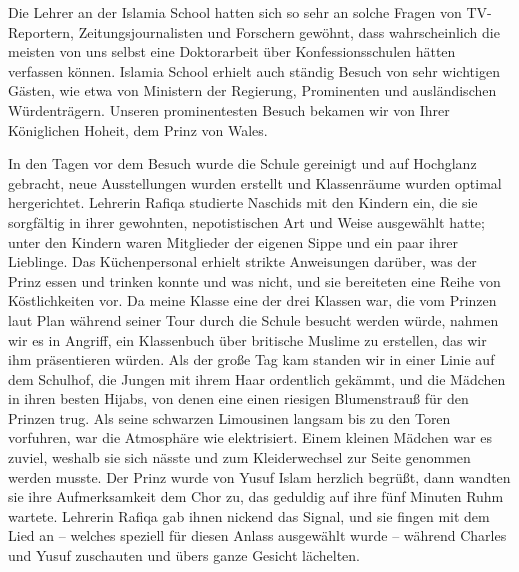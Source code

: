 \documentclass[12pt]{memoir}
\def\–{\hskip0pt-\hskip0pt}
\begin{document}
Die Lehrer an der Islamia School hatten sich so sehr an solche Fragen
von TV\–Reportern, Zeitungsjournalisten und Forschern gewöhnt,
dass wahrscheinlich die meisten von uns selbst
eine Doktorarbeit über Konfessionsschulen hätten verfassen können.
Islamia School erhielt auch ständig Besuch von sehr wichtigen Gästen,
wie etwa von Ministern der Regierung,
Prominenten und ausländischen Würdenträgern.
Unseren prominentesten Besuch bekamen wir von Ihrer Königlichen Hoheit,
dem Prinz von Wales.

In den Tagen vor dem Besuch wurde die Schule gereinigt
und auf Hochglanz gebracht,
neue Ausstellungen wurden erstellt
und Klassenräume wurden optimal hergerichtet.
Lehrerin Rafiqa studierte Naschids mit den Kindern ein,
die sie sorgfältig in ihrer gewohnten,
nepotistischen Art und Weise ausgewählt hatte;
unter den Kindern waren Mitglieder
der eigenen Sippe und ein paar ihrer Lieblinge.
Das Küchenpersonal erhielt strikte Anweisungen darüber,
was der Prinz essen und trinken konnte und was nicht,
und sie bereiteten eine Reihe von Köstlichkeiten vor.
Da meine Klasse eine der drei Klassen war,
die vom Prinzen laut Plan während seiner Tour
durch die Schule besucht werden würde, nahmen wir es in Angriff,
ein Klassenbuch über britische Muslime zu erstellen,
das wir ihm präsentieren würden.
Als der große Tag kam standen wir in einer Linie auf dem Schulhof,
die Jungen mit ihrem Haar ordentlich gekämmt,
und die Mädchen in ihren besten Hijabs,
von denen eine einen riesigen Blumenstrauß für den Prinzen trug.
Als seine schwarzen Limousinen langsam bis zu den Toren vorfuhren,
war die Atmosphäre wie elektrisiert.
Einem kleinen Mädchen war es zuviel,
weshalb sie sich nässte und zum Kleiderwechsel
zur Seite genommen werden musste.
Der Prinz wurde von Yusuf Islam herzlich begrüßt,
dann wandten sie ihre Aufmerksamkeit dem Chor zu,
das geduldig auf ihre fünf Minuten Ruhm wartete.
Lehrerin Rafiqa gab ihnen nickend das Signal,
und sie fingen mit dem Lied an –
welches speziell für diesen Anlass ausgewählt wurde –
während Charles und Yusuf zuschauten und übers ganze Gesicht lächelten.
\end{document}
